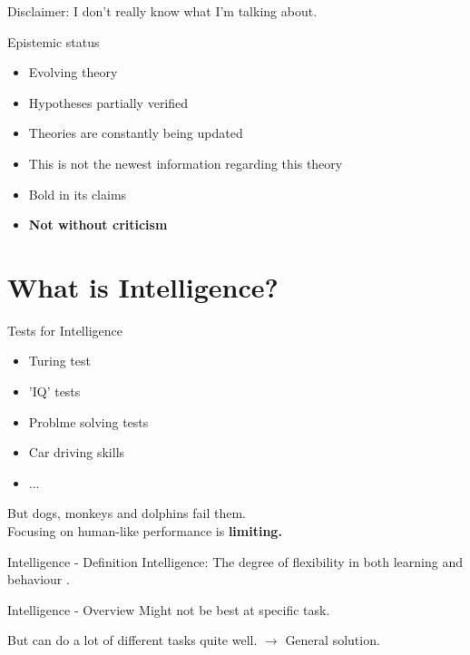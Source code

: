 
\begin{frame}[standout]
    Disclaimer: \pause I don't really know what I'm talking about.
\end{frame}

\begin{frame}[c]{Epistemic status}
    \Large
    \begin{itemize}[<+(1)->]
        \item Evolving theory
        \item Hypotheses partially verified
        \item Theories are constantly being updated
        \item This is not the newest information regarding this theory
        \item Bold in its claims
        \item \textbf{Not without criticism}
    \end{itemize}
\end{frame}


\section{What is Intelligence?}


\begin{frame}[c]{Tests for Intelligence}
    \Large
    \begin{itemize}[<+(1)->]
        \item Turing test
        \item 'IQ' tests
        \item Problme solving tests
        \item Car driving skills
        \item ...
    \end{itemize}
    \pause
    But dogs, monkeys and dolphins fail them. \\ \pause
    Focusing on human-like performance is \textbf{limiting.}
\end{frame}




%
%


\begin{frame}[c]{Intelligence - Definition}
    \Large
    \pause
    Intelligence: The degree of flexibility in both learning and behaviour \cite{hawkins2017book}.
\end{frame}


\begin{frame}[c]{Intelligence - Overview}
    \Large
    \pause
    Might not be best at specific task.

    \pause But can do a lot of different tasks quite well.
    \newline
    \newline
    \pause
    $\rightarrow$ General solution.
\end{frame}



